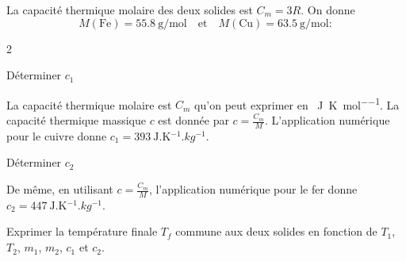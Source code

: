 La capacité thermique molaire des deux solides est  $C_m=3R$. On donne
\[
M(\textrm{Fe})=\SI{55,8}{\gram\per\mole}\quad \text{et} \quad M(\textrm{Cu}) =\SI{63,5}{\gram\per\mole} :
\]
\begin{multicols}{2}

\hauteurLargeurCadreReponse		{7mm}{2cm}



\begin{enonce}
Déterminer $c_1$ 
\end{enonce}


\begin{corrige}
La capacité thermique molaire est $C_m$ qu'on peut exprimer en \SI{}{\joule\per\kelvin\per\mol}. La capacité thermique massique $c$ est donnée par $c=\frac{C_m}{M}$.
L'application numérique pour le cuivre donne $c_1=\SI{393}{\joule.\kelvin^{-1}. kg^{-1}}$.
\end{corrige}



\begin{enonce}
Déterminer $c_2$
\end{enonce}


\begin{corrige}
De même, en utilisant $c=\frac{C_m}{M}$, l'application numérique pour le fer donne 
$c_2=\SI{447}{\joule.\kelvin^{-1}. kg^{-1}}$.
\end{corrige}



\end{multicols}

\hauteurLargeurCadreReponse		{8mm}{6cm}



\begin{enonce}
Exprimer la température finale $T_f$ commune aux deux solides
en fonction de $T_1$, $T_2$, $m_1$, $m_2$, $c_1$ et $c_2$.

\end{enonce}

